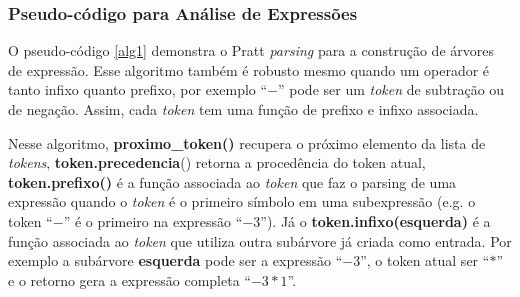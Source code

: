 \documentclass[english, 
               brazil, 
               bsc] %
               {dcomp-abntex2}
\begin{document}
%
%
%
%


\subsubsection{Pseudo-código para Análise de Expressões}


O pseudo-código \ref{alg1}
demonstra o Pratt \textit{parsing} para a construção de árvores de expressão. Esse algoritmo também é robusto mesmo quando um operador é tanto infixo quanto prefixo, por exemplo ``$-$'' pode ser um \textit{token} de subtração ou de negação. Assim, cada \textit{token} tem uma função de prefixo e infixo associada.


Nesse algoritmo, 
\textbf{proximo\_token()} recupera o próximo elemento da lista de \textit{tokens},
\textbf{token.precedencia}() retorna a procedência do token atual, \textbf{token.prefixo()} é a função associada ao \textit{token} que faz o parsing de uma expressão quando o \textit{token} é o primeiro símbolo em uma subexpressão (e.g. o token ``$-$'' é o primeiro na expressão ``$-3$''). Já o \textbf{token.infixo(esquerda)} é a função associada ao \textit{token} que utiliza outra subárvore já criada como entrada. Por exemplo a subárvore \textbf{esquerda} pode ser a expressão ``$-3$'', o token atual ser ``$*$'' e o retorno gera a expressão completa ``$-3 * 1$''.
\end{document}
